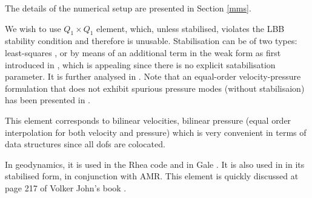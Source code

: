 The details of the numerical setup are presented in Section \ref{mms}.

We wish to use $Q_1 \times Q_1$ element, which, unless stabilised,
violates  the LBB stability condition and therefore is unusable. 
Stabilisation can be of two types: least-squares \cite{dohu03,temr92,kibr12,gubl07},
or by means of an additional term in the weak form as first introduced in \cite{dobo04,bodg06}, 
which is appealing since there is no explicit satabilisation parameter.
It is further analysed in \cite{nosi01,lihc09,hufb86,shry78,grcc95}.
Note that an equal-order velocity-pressure formulation that does not exhibit spurious
pressure modes (without stabilisaion) has been presented in \cite{risc86}.

This element corresponds to bilinear velocities, bilinear pressure 
(equal order interpolation for both velocity and pressure) which is 
very convenient in terms of data structures since all dofs are colocated.

In geodynamics, it is used in the Rhea code \cite{stgb10,busa13} and in Gale \cite{arbi13}.
It is also used in \cite{lezh11} in its stabilised form, in conjunction with AMR. 
This element is quickly discussed at page 217 of Volker John's book \cite{john16}.

